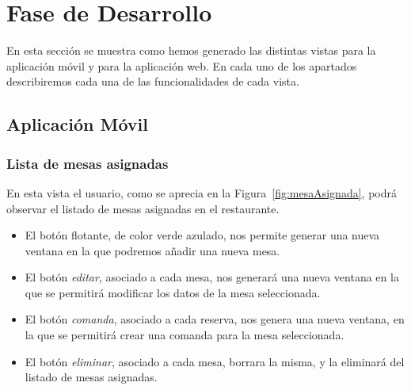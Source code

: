 \section{Fase de Desarrollo}
En esta sección se muestra como hemos generado las distintas vistas para la aplicación móvil y para la aplicación web. En cada uno de los apartados describiremos cada una de las funcionalidades de cada vista.

\subsection{Aplicación Móvil}

\subsubsection*{Lista de mesas asignadas}

En esta vista el usuario, como se aprecia en la Figura~\ref{fig:mesaAsignada}, podrá observar el listado de mesas asignadas en el restaurante. 

\begin{itemize} 

\item El botón flotante, de color verde azulado, nos permite generar una nueva ventana en la que podremos añadir una nueva mesa.
 
\item El botón \textit{editar}, asociado a cada mesa, nos generará una nueva ventana en la que se permitirá modificar los datos de la mesa seleccionada.
 
 \item El botón \textit{comanda}, asociado a cada reserva, nos genera una nueva ventana, en la que se permitirá crear una comanda para la mesa seleccionada.
 
 \item El botón \textit{eliminar}, asociado a cada mesa, borrara la misma, y la eliminará del listado de mesas asignadas.
 
 \end{itemize}

